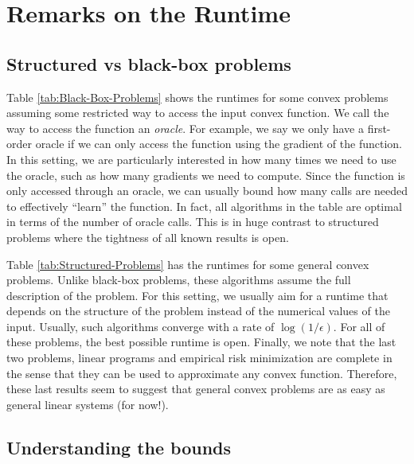 \section{Remarks on the Runtime}

\subsection{Structured vs black-box problems}

Table \ref{tab:Black-Box-Problems} shows the runtimes for some convex
problems assuming some restricted way to access the input convex function.
We call the way to access the function an \emph{oracle}. For example,
we say we only have a first-order oracle if we can only access the
function using the gradient of the function. In this setting, we are
particularly interested in how many times we need to use the oracle,
such as how many gradients we need to compute. Since the function
is only accessed through an oracle, we can usually bound how many
calls are needed to effectively ``learn'' the function. In fact,
all algorithms in the table are optimal in terms of the number of
oracle calls. This is in huge contrast to structured problems where
the tightness of all known results is open.

Table \ref{tab:Structured-Problems} has the runtimes for some general
convex problems. Unlike black-box problems, these algorithms assume
the full description of the problem. For this setting, we usually
aim for a runtime that depends on the structure of the problem instead
of the numerical values of the input. Usually, such algorithms converge
with a rate of $\log(1/\epsilon)$. For all of these problems, the
best possible runtime is open. Finally, we note that the last two
problems, linear programs and empirical risk minimization are complete
in the sense that they can be used to approximate any convex function.
Therefore, these last results seem to suggest that general convex
problems are as easy as general linear systems (for now!).

\subsection{Understanding the bounds}


